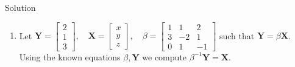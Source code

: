 \documentclass[12pt]{article}
\begin{document}
Solution 
\begin{enumerate}
    \item Let $\mathbf{Y} = \begin{bmatrix}
        2\\1\\3 \end{bmatrix}, \quad  \mathbf{X} = \begin{bmatrix}
            x \\ y\\ z
        \end{bmatrix}, \quad \beta = \begin{bmatrix}
            1&1&2 \\ 3&-2&1 \\ 0&1&-1
        \end{bmatrix}$ such that $\mathbf{Y}=\beta\mathbf{X}$. Using the known equations $\beta, \mathbf{Y}$ we compute $\beta^{-1} \mathbf{Y}= \mathbf{X}$.


\end{enumerate}
\end{document}
